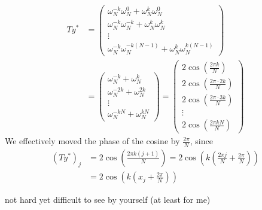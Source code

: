 \begin{remark}
\begin{enumerate}[label = \theremark.\arabic*]
\[\begin{aligned}
				      Ty^*
				       & = \begin{pmatrix}
					           \omega_N^{-k} \omega_N^{0} + \omega_N^k \omega_N^{0}  \\
					           \omega_N^{-k} \omega_N^{-k} + \omega_N^k \omega_N^{k} \\
					           \vdots                                                \\
					           \omega_N^{-k} \omega_N^{-k(N-1)} + \omega_N^k \omega_N^{k(N-1)}
				           \end{pmatrix}
				      \\ & = \begin{pmatrix}
					      \omega_N^{-k} + \omega_N^{k}   \\
					      \omega_N^{-2k} + \omega_N^{2k} \\
					      \vdots                         \\
					      \omega_N^{-kN} + \omega_N^{kN}
				      \end{pmatrix} =
				      \begin{pmatrix}
					      2\cos\left(\frac{2\pi k}{N}\right)        \\
					      2\cos\left(\frac{2\pi \cdot 2k}{N}\right) \\
					      2\cos\left(\frac{2\pi \cdot 3k}{N}\right) \\
					      \vdots                                    \\
					      2\cos\left(\frac{2\pi kN}{N}\right)
				      \end{pmatrix}
			      \end{aligned}\]
		      We effectively moved the phase of the cosine by $\frac{2\pi}{N}$, since
		      \[\begin{aligned}
				      {(Ty^*)}_j
				       & = 2\cos\left(\frac{2\pi k(j+1)}{N}\right)
				      = 2\cos\left(k\left(\frac{2\pi j}{N} + \frac{2\pi}{N}\right)\right)
				      \\ &= 2\cos\left(k\left(x_j + \frac{2\pi}{N}\right)\right)
			      \end{aligned}\]

		      not hard yet difficult to see by yourself (at least for me)
	\end{enumerate}
\end{remark}

